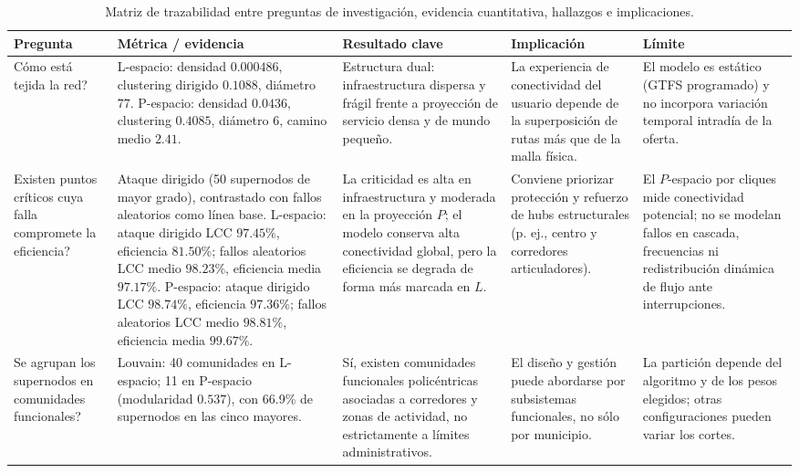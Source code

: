\begin{table}[h!]
    \centering
    \scriptsize
    \renewcommand{\arraystretch}{1.2}
    \setlength{\tabcolsep}{3pt}
    \begin{tabular}{@{}p{} p{} p{} p{} p{}@{}}
        \toprule
        \textbf{Pregunta} & \textbf{Métrica / evidencia} & \textbf{Resultado clave} & \textbf{Implicación} & \textbf{Límite} \\
        \midrule
        \invquestion{}Cómo está tejida la red? &
        L-espacio: densidad $0.000486$, clustering dirigido $0.1088$, diámetro $77$. P-espacio: densidad $0.0436$, clustering $0.4085$, diámetro $6$, camino medio $2.41$. &
        Estructura dual: infraestructura dispersa y frágil frente a proyección de servicio densa y de mundo pequeño. &
        La experiencia de conectividad del usuario depende de la superposición de rutas más que de la malla física. &
        El modelo es estático (GTFS programado) y no incorpora variación temporal intradía de la oferta. \\
        \midrule
        \invquestion{}Existen puntos críticos cuya falla compromete la eficiencia? &
        Ataque dirigido (50 supernodos de mayor grado), contrastado con fallos aleatorios como línea base. L-espacio: ataque dirigido LCC $97.45\%$, eficiencia $81.50\%$; fallos aleatorios LCC medio $98.23\%$, eficiencia media $97.17\%$. P-espacio: ataque dirigido LCC $98.74\%$, eficiencia $97.36\%$; fallos aleatorios LCC medio $98.81\%$, eficiencia media $99.67\%$. &
        La criticidad es alta en infraestructura y moderada en la proyección $P$; el modelo conserva alta conectividad global, pero la eficiencia se degrada de forma más marcada en $L$. &
        Conviene priorizar protección y refuerzo de hubs estructurales (p. ej., centro y corredores articuladores). &
        El $P$-espacio por cliques mide conectividad potencial; no se modelan fallos en cascada, frecuencias ni redistribución dinámica de flujo ante interrupciones. \\
        \midrule
        \invquestion{}Se agrupan los supernodos en comunidades funcionales? &
        Louvain: 40 comunidades en L-espacio; 11 en P-espacio (modularidad $0.537$), con 66.9\% de supernodos en las cinco mayores. &
        Sí, existen comunidades funcionales policéntricas asociadas a corredores y zonas de actividad, no estrictamente a límites administrativos. &
        El diseño y gestión puede abordarse por subsistemas funcionales, no sólo por municipio. &
        La partición depende del algoritmo y de los pesos elegidos; otras configuraciones pueden variar los cortes. \\
        \bottomrule
    \end{tabular}
    \caption{Matriz de trazabilidad entre preguntas de investigación, evidencia cuantitativa, hallazgos e implicaciones.}
    \label{tab:trazabilidad_preguntas}
\end{table}

